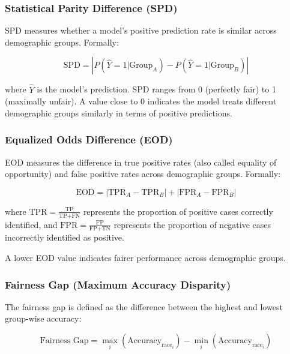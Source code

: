\documentclass[11pt,a4paper]{report}
\begin{document}
\subsubsection{Statistical Parity Difference (SPD)}

SPD measures whether a model's positive prediction rate is similar across demographic groups. Formally:

\begin{equation}
\text{SPD} = \left| P(\hat{Y} = 1 | \text{Group}_A) - P(\hat{Y} = 1 | \text{Group}_B) \right|
\end{equation}

where $\hat{Y}$ is the model's prediction. SPD ranges from 0 (perfectly fair) to 1 (maximally unfair). A value close to 0 indicates the model treats different demographic groups similarly in terms of positive predictions.

\subsubsection{Equalized Odds Difference (EOD)}

EOD measures the difference in true positive rates (also called equality of opportunity) and false positive rates across demographic groups. Formally:

\begin{equation}
\text{EOD} = |\text{TPR}_A - \text{TPR}_B| + |\text{FPR}_A - \text{FPR}_B|
\end{equation}

where $\text{TPR} = \frac{\text{TP}}{\text{TP} + \text{FN}}$ represents the proportion of positive cases correctly identified, and $\text{FPR} = \frac{\text{FP}}{\text{FP} + \text{TN}}$ represents the proportion of negative cases incorrectly identified as positive.

A lower EOD value indicates fairer performance across demographic groups.

\subsubsection{Fairness Gap (Maximum Accuracy Disparity)}

The fairness gap is defined as the difference between the highest and lowest group-wise accuracy:

\begin{equation}
\text{Fairness Gap} = \max_i(\text{Accuracy}_{\text{race}_i}) - \min_i(\text{Accuracy}_{\text{race}_i})
\end{equation}
\end{document}
